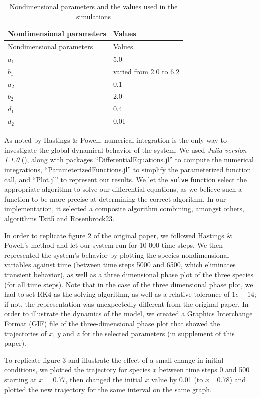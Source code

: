 \documentclass[
]{article}
\begin{document}
\hypertarget{tbl:table1}{}
\begin{longtable}[]{@{}ll@{}}
\caption{\label{tbl:table1}Nondimensional parameters and the values used
in the simulations}\tabularnewline
\toprule
Nondimensional parameters & Values\tabularnewline
\midrule
\endfirsthead
\toprule
Nondimensional parameters & Values\tabularnewline
\midrule
\endhead
\(a_1\) & 5.0\tabularnewline
\(b_1\) & varied from 2.0 to 6.2\tabularnewline
\(a_2\) & 0.1\tabularnewline
\(b_2\) & 2.0\tabularnewline
\(d_1\) & 0.4\tabularnewline
\(d_2\) & 0.01\tabularnewline
\bottomrule
\end{longtable}

As noted by Hastings \& Powell, numerical integration is the only way to
investigate the global dynamical behavior of the system. We used
\emph{Julia version 1.1.0} (\textcite{bezanson2017}), along with
packages ``DifferentialEquations.jl'' to compute the numerical
integrations, ``ParameterizedFunctions.jl'' to simplify the
parameterized function call, and ``Plot.jl'' to represent our results.
We let the \texttt{solve} function select the appropriate algorithm to
solve our differential equations, as we believe such a function to be
more precise at determining the correct algorithm. In our
implementation, it selected a composite algorithm combining, amongst
others, algorithms Tsit5 and Rosenbrock23.

In order to replicate figure 2 of the original paper, we followed
Hastings \& Powell's method and let our system run for 10 000 time
steps. We then represented the system's behavior by plotting the species
nondimensional variables against time (between time steps 5000 and 6500,
which eliminates transient behavior), as well as a three dimensional
phase plot of the three species (for all time steps). Note that in the
case of the three dimensional phase plot, we had to set RK4 as the
solving algorithm, as well as a relative tolerance of \(1e-14\); if not,
the representation was unexpectedly different from the original paper.
In order to illustrate the dynamics of the model, we created a Graphics
Interchange Format (GIF) file of the three-dimensional phase plot that
showed the trajectories of \(x\), \(y\) and \(z\) for the selected
parameters (in supplement of this paper).

To replicate figure 3 and illustrate the effect of a small change in
initial conditions, we plotted the trajectory for species \(x\) between
time steps 0 and 500 starting at \(x\) = 0.77, then changed the initial
\(x\) value by 0.01 (to \(x\) =0.78) and plotted the new trajectory for
the same interval on the same graph.
\end{document}
